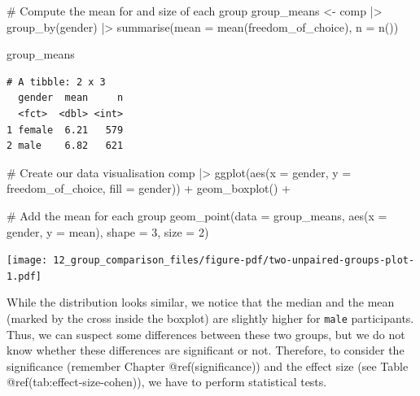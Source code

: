 \documentclass[
  letterpaper,
]{krantz}
\makeatletter
\newenvironment{Shaded}{\begin{snugshade}}{\end{snugshade}}
\newcommand{\AttributeTok}[1]{\textcolor[rgb]{0.40,0.45,0.13}{#1}}
\newcommand{\CommentTok}[1]{\textcolor[rgb]{0.37,0.37,0.37}{#1}}
\newcommand{\DecValTok}[1]{\textcolor[rgb]{0.68,0.00,0.00}{#1}}
\newcommand{\FunctionTok}[1]{\textcolor[rgb]{0.28,0.35,0.67}{#1}}
\newcommand{\NormalTok}[1]{\textcolor[rgb]{0.00,0.23,0.31}{#1}}
\newcommand{\OtherTok}[1]{\textcolor[rgb]{0.00,0.23,0.31}{#1}}
\newcommand{\SpecialCharTok}[1]{\textcolor[rgb]{0.37,0.37,0.37}{#1}}
\newenvironment{kframe}{%
\medskip{}
\setlength{\fboxsep}{.8em}
 \def\at@end@of@kframe{}%
 \ifinner\ifhmode%
  \def\at@end@of@kframe{\end{minipage}}%
  \begin{minipage}{\columnwidth}%
 \fi\fi%
 \def\FrameCommand##1{\hskip\@totalleftmargin \hskip-\fboxsep
 \colorbox{shadecolor}{##1}\hskip-\fboxsep
     \hskip-\linewidth \hskip-\@totalleftmargin \hskip\columnwidth}%
 \MakeFramed {\advance\hsize-\width
   \@totalleftmargin\z@ \linewidth\hsize
   \@setminipage}}%
 {\par\unskip\endMakeFramed%
 \at@end@of@kframe}
\renewenvironment{Shaded}{\begin{kframe}}{\end{kframe}}
\makeatother
\begin{document}
\begin{Shaded}
\begin{Highlighting}[]
\CommentTok{\# Compute the mean for and size of each group}
\NormalTok{group\_means }\OtherTok{\textless{}{-}}
\NormalTok{  comp }\SpecialCharTok{|\textgreater{}}
  \FunctionTok{group\_by}\NormalTok{(gender) }\SpecialCharTok{|\textgreater{}}
  \FunctionTok{summarise}\NormalTok{(}\AttributeTok{mean =} \FunctionTok{mean}\NormalTok{(freedom\_of\_choice),}
            \AttributeTok{n =} \FunctionTok{n}\NormalTok{())}

\NormalTok{group\_means}
\end{Highlighting}
\end{Shaded}

\begin{verbatim}
# A tibble: 2 x 3
  gender  mean     n
  <fct>  <dbl> <int>
1 female  6.21   579
2 male    6.82   621
\end{verbatim}

\begin{Shaded}
\begin{Highlighting}[]
\CommentTok{\# Create our data visualisation}
\NormalTok{comp }\SpecialCharTok{|\textgreater{}}
  \FunctionTok{ggplot}\NormalTok{(}\FunctionTok{aes}\NormalTok{(}\AttributeTok{x =}\NormalTok{ gender, }\AttributeTok{y =}\NormalTok{ freedom\_of\_choice, }\AttributeTok{fill =}\NormalTok{ gender)) }\SpecialCharTok{+}
  \FunctionTok{geom\_boxplot}\NormalTok{() }\SpecialCharTok{+}

  \CommentTok{\# Add the mean for each group}
  \FunctionTok{geom\_point}\NormalTok{(}\AttributeTok{data =}\NormalTok{ group\_means,}
             \FunctionTok{aes}\NormalTok{(}\AttributeTok{x =}\NormalTok{ gender, }\AttributeTok{y =}\NormalTok{ mean),}
             \AttributeTok{shape =} \DecValTok{3}\NormalTok{,}
             \AttributeTok{size =} \DecValTok{2}\NormalTok{)}
\end{Highlighting}
\end{Shaded}

\texttt{[image: 12\_group\_comparison\_files/figure-pdf/two-unpaired-groups-plot-1.pdf]}

While the distribution looks similar, we notice that the median and the
mean (marked by the cross inside the boxplot) are slightly higher for
\texttt{male} participants. Thus, we can suspect some differences
between these two groups, but we do not know whether these differences
are significant or not. Therefore, to consider the significance
(remember Chapter @ref(significance)) and the effect size (see Table
@ref(tab:effect-size-cohen)), we have to perform statistical tests.
\end{document}
